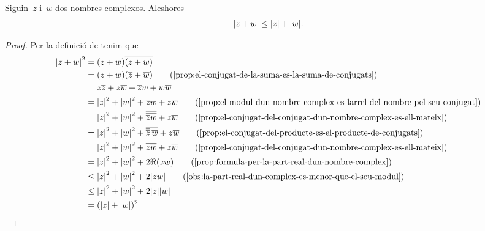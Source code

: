 \documentclass[../../main.tex]{subfiles}
\begin{document}
    \begin{proposition}
        \label{prop:desigualta-triangular-nombres-complexos}
        Siguin~\(z\) i~\(w\) dos nombres complexos.
        Aleshores
        \[
            \modul{z+w} \leq \modul{z}+\modul{w}.
        \]
    \end{proposition}
    \begin{proof}
        Per la definició de  tenim que
        \begin{align*}
            \modul{z+w}^{2} &= (z+w)\conjugat{(z+w)} \\
                            &= (z+w)(\conjugat{z}+\conjugat{w})
                            \tag{\ref{prop:el-conjugat-de-la-suma-es-la-suma-de-conjugats}} \\
                            &= z\conjugat{z}+z\conjugat{w}
                               +\conjugat{z}w+w\conjugat{w} \\
                            &= \modul{z}^{2}+\modul{w}^{2}
                               +\conjugat{z}w+z\conjugat{w}
                            \tag{\ref{prop:el-modul-dun-nombre-complex-es-larrel-del-nombre-pel-seu-conjugat}} \\
                            &= \modul{z}^{2}+\modul{w}^{2}
                               +\conjugat{\conjugat{\conjugat{z}w}}+z\conjugat{w}
                               \tag{\ref{prop:el-conjugat-del-conjugat-dun-nombre-complex-es-ell-mateix}} \\
                            &= \modul{z}^{2}+\modul{w}^{2}
                               +\conjugat{\conjugat{\conjugat{z}}\,\conjugat{w}}+z\conjugat{w}
                            \tag{\ref{prop:el-conjugat-del-producte-es-el-producte-de-conjugats}} \\
                            &= \modul{z}^{2}+\modul{w}^{2}
                               +\conjugat{z\conjugat{w}}+z\conjugat{w}
                            \tag{\ref{prop:el-conjugat-del-conjugat-dun-nombre-complex-es-ell-mateix}} \\
                            &= \modul{z}^{2}+\modul{w}^{2}+2\Re(zw)
                            \tag{\ref{prop:formula-per-la-part-real-dun-nombre-complex}} \\
                            &\leq \modul{z}^{2}+\modul{w}^{2}+2\modul{zw}
                            \tag{\ref{obs:la-part-real-dun-complex-es-menor-que-el-seu-modul}} \\
                            &\leq \modul{z}^{2}+\modul{w}^{2}
                                  +2\modul{z}\modul{w} \\
                            &= (\modul{z}+\modul{w})^{2}
        \end{align*}
    \end{proof}
\end{document}
